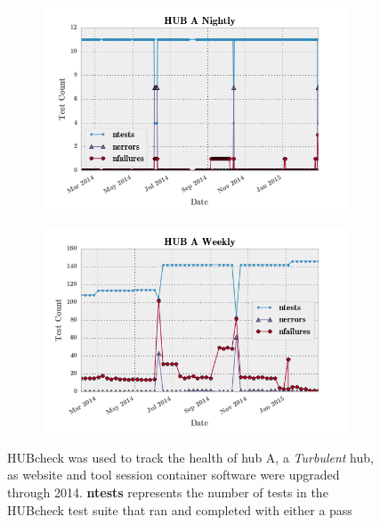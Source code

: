 \begin{figure}[ht!]
        \centering
        \begin{subfigure}[b]{0.65\textwidth}
                \centering
                \includegraphics[width=\textwidth]{../../images/summary_plots/hub_a_nightly.png}
        \end{subfigure}
        \begin{subfigure}[b]{0.65\textwidth}
                \centering
                \includegraphics[width=\textwidth]{../../images/summary_plots/hub_a_weekly.png}
        \end{subfigure}
        \caption{ HUBcheck was used to track the health of hub A,
                  a \textit{Turbulent} hub, as website and tool session
                  container software were upgraded through 2014.
                  \textbf{ntests} represents the number of tests in the HUBcheck
                  test suite that ran and completed with either a pass
}
\end{figure}
